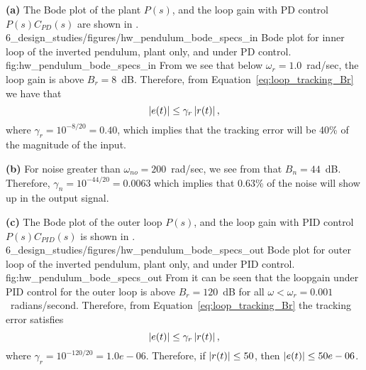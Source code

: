 
{\bf (a)} The Bode plot of the plant $P(s)$, and the loop gain with PD control $P(s)C_{PD}(s)$ are shown in .
	{6_design_studies/figures/hw_pendulum_bode_specs_in}
	{Bode plot for inner loop of the inverted pendulum, plant only, and under PD control.}
	{fig:hw_pendulum_bode_specs_in}
From  we see that below $\omega_r = 1.0$~rad/sec, the loop gain is above $B_r=8$~dB.  Therefore, from Equation~\eqref{eq:loop_tracking_Br} we have that
\[
\left|e(t)\right| \leq \gamma_r \left|r(t)\right|,
\]
where $\gamma_r = 10^{-8/20} = 0.40$, which implies that the tracking error will be 40\% of the magnitude of the input.

{\bf (b)} For noise greater than $\omega_{no}=200$~rad/sec, we see from  that $B_n = 44$~dB.  Therefore, $\gamma_n = 10^{-44/20} = 0.0063$ which implies that $0.63$\% of the noise will show up in the output signal.

{\bf (c)}  
The Bode plot of the outer loop $P(s)$, and the loop gain with PID control $P(s)C_{PID}(s)$ is shown in .
	{6_design_studies/figures/hw_pendulum_bode_specs_out}
	{Bode plot for outer loop of the inverted pendulum, plant only, and under PID control.}
	{fig:hw_pendulum_bode_specs_out}
From  it can be seen that the loopgain under PID control for the outer loop is above $B_r=120$~dB for all $\omega<\omega_r=0.001$~radians/second.  Therefore, from Equation~\eqref{eq:loop_tracking_Br} the tracking error satisfies
\[
\left|e(t)\right|\leq \gamma_r \left|r(t)\right|,
\]
where $\gamma_r = 10^{-120/20}=1.0e-06$.  Therefore, if $\left|r(t)\right|\leq 50$, then $\left|e(t)\right|\leq 50e-06$.

